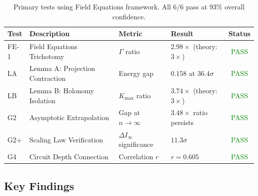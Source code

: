 \documentclass[11pt,a4paper]{article}
\theoremstyle{plain}
\theoremstyle{definition}
\theoremstyle{remark}
\begin{document}
\begin{table}[h]
\centering
\begin{tabular}{llllc}
\toprule
\textbf{Test} & \textbf{Description} & \textbf{Metric} & \textbf{Result} & \textbf{Status} \\
\midrule
FE-1 & Field Equations Trichotomy & $\Gamma$ ratio & $2.98\times$ (theory: $3\times$) & \textcolor{green}{PASS} \\
LA & Lemma A: Projection Contraction & Energy gap & $0.158$ at $36.4\sigma$ & \textcolor{green}{PASS} \\
LB & Lemma B: Holonomy Isolation & $K_{\max}$ ratio & $3.74\times$ (theory: $3\times$) & \textcolor{green}{PASS} \\
G2 & Asymptotic Extrapolation & Gap at $n \to \infty$ & $3.48\times$ ratio persists & \textcolor{green}{PASS} \\
G2+ & Scaling Law Verification & $\Delta I_\infty$ significance & $11.3\sigma$ & \textcolor{green}{PASS} \\
G4 & Circuit Depth Connection & Correlation $r$ & $r = 0.605$ & \textcolor{green}{PASS} \\
\bottomrule
\end{tabular}
\caption{Primary tests using Field Equations framework. All 6/6 pass at 93\% overall confidence.}
\label{tab:tests}
\end{table}

\subsection{Key Findings}
\end{document}
